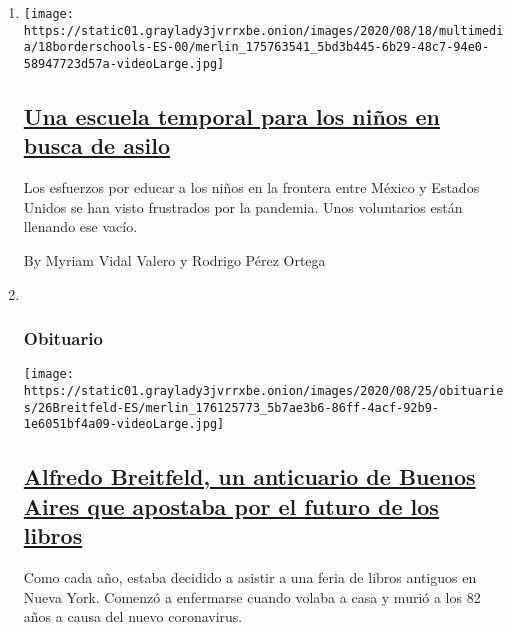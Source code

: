 \begin{enumerate}
\def\labelenumi{\arabic{enumi}.}
\item
  \texttt{[image: https://static01.graylady3jvrrxbe.onion/images/2020/08/18/multimedia/18borderschools-ES-00/merlin\_175763541\_5bd3b445-6b29-48c7-94e0-58947723d57a-videoLarge.jpg]}

  \hypertarget{una-escuela-temporal-para-los-niuxf1os-en-busca-de-asilo}{%
  \subsection{\texorpdfstring{\href{/es/2020/08/18/espanol/america-latina/escuela-frontera-mexico.html}{Una
  escuela temporal para los niños en busca de
  asilo}}{Una escuela temporal para los niños en busca de asilo}}\label{una-escuela-temporal-para-los-niuxf1os-en-busca-de-asilo}}

  Los esfuerzos por educar a los niños en la frontera entre México y
  Estados Unidos se han visto frustrados por la pandemia. Unos
  voluntarios están llenando ese vacío.

  By Myriam Vidal Valero y Rodrigo Pérez Ortega
\item ~
  \hypertarget{obituario}{%
  \subsubsection{Obituario}\label{obituario}}

  \texttt{[image: https://static01.graylady3jvrrxbe.onion/images/2020/08/25/obituaries/26Breitfeld-ES/merlin\_176125773\_5b7ae3b6-86ff-4acf-92b9-1e6051bf4a09-videoLarge.jpg]}

  \hypertarget{alfredo-breitfeld-un-anticuario-de-buenos-aires-que-apostaba-por-el-futuro-de-los-libros}{%
  \subsection{\texorpdfstring{\href{/es/2020/08/27/espanol/cultura/Alfredo-Breitfeld-librero.html}{Alfredo
  Breitfeld, un anticuario de Buenos Aires que apostaba por el futuro de
  los
  libros}}{Alfredo Breitfeld, un anticuario de Buenos Aires que apostaba por el futuro de los libros}}\label{alfredo-breitfeld-un-anticuario-de-buenos-aires-que-apostaba-por-el-futuro-de-los-libros}}

  Como cada año, estaba decidido a asistir a una feria de libros
  antiguos en Nueva York. Comenzó a enfermarse cuando volaba a casa y
  murió a los 82 años a causa del nuevo coronavirus.


\end{enumerate}
